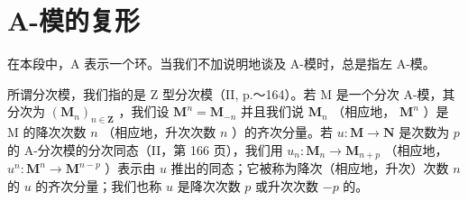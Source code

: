 \section{A-模的复形}

在本段中，A 表示一个环。当我们不加说明地谈及 A-模时，总是指左 A-模。

所谓分次模，我们指的是 Z 型分次模（II, p.～164）。若 M 是一个分次 A-模，其分次为 \((\mathbf{M}_n)_{n \in \mathbf{Z}}\) ，我们设 \(\mathbf{M}^n = \mathbf{M}_{-n}\) 并且我们说 \(\mathbf{M}_n\) （相应地， \(\mathbf{M}^n\) ）是 M 的降次次数 \(n\) （相应地，升次次数 \(n\) ）的齐次分量。若 \(u: \mathbf{M} \to \mathbf{N}\) 是次数为 \(p\) 的 A-分次模的分次同态（II，第 166 页），我们用 \(u_n: \mathbf{M}_n \to \mathbf{M}_{n+p}\) （相应地， \(u^n: \mathbf{M}^n \to \mathbf{M}^{n-p}\) ）表示由 \(u\) 推出的同态；它被称为降次（相应地，升次）次数 \(n\) 的 \(u\) 的齐次分量；我们也称 \(u\) 是降次次数 \(p\) 或升次次数 \(-p\) 的。

